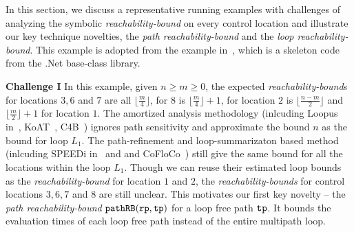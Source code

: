 In this section, we discuss a representative running examples with
challenges of analyzing the symbolic
\emph{reachability-bound} on
every control location and illustrate our key technique novelties, the \emph{path reachability-bound} and the \emph{loop reachability-bound}.
This example is adopted from the example in~\cite{GulwaniZ10}, which
is a skeleton code from the .Net base-class library.


\textbf{Challenge I}
  In this example, given $n \geq m \geq 0$,
the expected \emph{reachability-bound}s for locations $3, 6$ and $7$ are all $\lfloor\frac{m}{4}\rfloor$, for $8$ is $\lfloor\frac{m}{4}\rfloor + 1$,
for location $2$ is $\lfloor\frac{n-m}{2}\rfloor$ and $\lfloor\frac{m}{2}\rfloor + 1$ for location $1$.
The amortized analysis methodology (inlcuding Loopus in~\cite{SinnZV17}, KoAT~\cite{BrockschmidtEFFG14,FalkeKS12,FalkeKS11}, C4B~\cite{CarbonneauxHS15}) ignores path sensitivity and approximate the bound $n$ as the bound for loop $L_1$. 
The path-refinement and loop-summarizaton based method (inlcuding SPEEDi in~\cite{GulwaniZ10} and \cite{GulwaniJK09} and CoFloCo~\cite{Montoya17,Flores-Montoya16,Flores-MontoyaH14}) still give the same bound for all the locations within the loop $L_1$. 
Though we can reuse their estimated loop bounds as the \emph{reachability-bound} for location $1$ and $2$,
the \emph{reachability-bounds} for control locations $3, 6, 7$ and $8$ are still unclear.
%
This motivates our first key novelty -- the \emph{path reachability-bound} $\mathtt{pathRB}(\mathtt{rp}, \mathtt{tp})$ for a loop free path $\mathtt{tp}$.
It bounds the evaluation times of each loop free path instead of the entire multipath loop.

